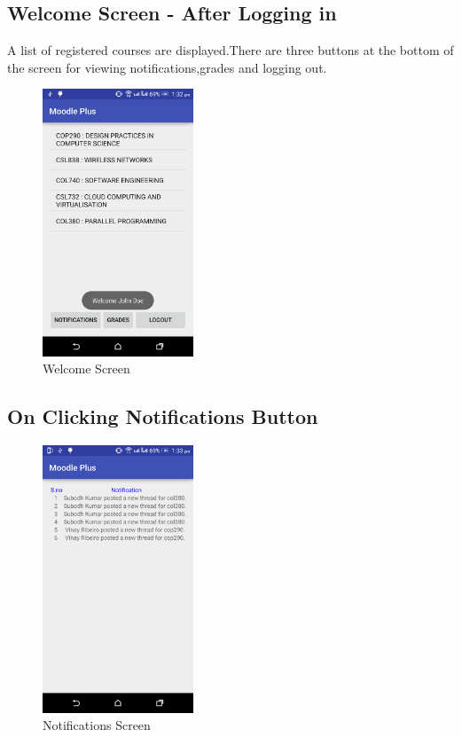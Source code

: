 \documentclass[12pt]{article}
\begin{document}
\subsection{Welcome Screen - After Logging in}
A list of registered courses are displayed.There are three buttons at the bottom of the screen for viewing notifications,grades and logging out.\\   
\begin{figure}[!ht]
	\centering
	\includegraphics[width=0.4\textwidth]{images/Welcome_screen.png}
	\caption{Welcome Screen}
\end{figure}
\FloatBarrier

\subsection{On Clicking Notifications Button}
\begin{figure}[!ht]
	\centering
	\includegraphics[width=0.4\textwidth]{images/notifications.png}
	\caption{Notifications Screen}
\end{figure}
\FloatBarrier
\end{document}
